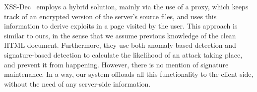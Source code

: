 XSS-Dec~\cite{Sundareswaran:2012:XHS:2352970.2352994} employs a hybrid solution, mainly via the use of a proxy, which keeps track of an encrypted version of the server's source files, and uses this information to derive exploits in a page visited by the user. This approach is similar to ours, in the sense that we assume previous knowledge of the clean HTML document. Furthermore, they use both anomaly-based detection and signature-based detection to calculate the likelihood of an attack taking place, and prevent it from happening. However, there is no mention of signature maintenance. In a way, our system offloads all this functionality to the client-side, without the need of any server-side information.

